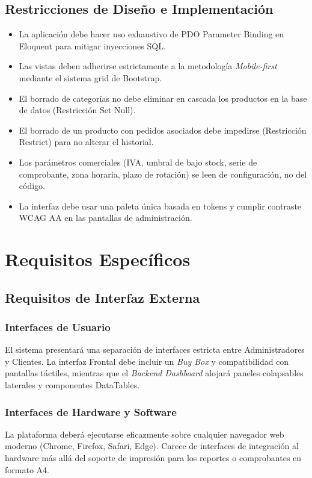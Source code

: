 \documentclass[12pt, a4paper]{article}
\begin{document}
\subsection{Restricciones de Diseño e Implementación}
\begin{itemize}
    \item La aplicación debe hacer uso exhaustivo de PDO Parameter Binding en Eloquent para mitigar inyecciones SQL.
    \item Las vistas deben adherirse estrictamente a la metodología \textit{Mobile-first} mediante el sistema grid de Bootstrap.
    \item El borrado de categorías no debe eliminar en cascada los productos en la base de datos (Restricción Set Null).
    \item El borrado de un producto con pedidos asociados debe impedirse (Restricción Restrict) para no alterar el historial.
    \item Los parámetros comerciales (IVA, umbral de bajo stock, serie de comprobante, zona horaria, plazo de rotación) se leen de configuración, no del código.
    \item La interfaz debe usar una paleta única basada en tokens y cumplir contraste WCAG AA en las pantallas de administración.
\end{itemize}

\section{Requisitos Específicos}

\subsection{Requisitos de Interfaz Externa}
\subsubsection{Interfaces de Usuario}
El sistema presentará una separación de interfaces estricta entre Administradores y Clientes. La interfaz Frontal debe incluir un \textit{Buy Box} y compatibilidad con pantallas táctiles, mientras que el \textit{Backend Dashboard} alojará paneles colapsables laterales y componentes DataTables.

\subsubsection{Interfaces de Hardware y Software}
La plataforma deberá ejecutarse eficazmente sobre cualquier navegador web moderno (Chrome, Firefox, Safari, Edge). Carece de interfaces de integración al hardware más allá del soporte de impresión para los reportes o comprobantes en formato A4.
\end{document}
